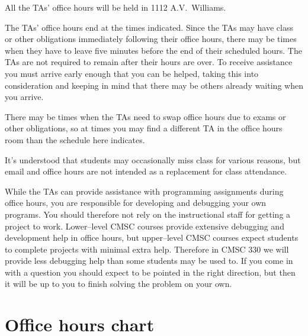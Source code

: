 \documentclass[11pt]{article}
\begin{document}
    All the TAs' office hours will be held in 1112 A.V.\ Williams.

    The TAs' office hours end at the times indicated.  Since the TAs may have
  class or other obligations immediately following their office hours, there
  may be times when they have to leave five minutes before the end of their
  scheduled hours.  The TAs are not required to remain after their hours are
  over.  To receive assistance you must arrive early enough that you can be
  helped, taking this into consideration and keeping in mind that there may
  be others already waiting when you arrive.

    There may be times when the TAs need to swap office hours due to exams
  or other obligations, so at times you may find a different TA in the
  office hours room than the schedule here indicates.

    It's understood that students may occasionally miss class for various
  reasons, but email and office hours are not intended as a replacement for
  class attendance.

    While the TAs can provide assistance with programming assignments during
  office hours, you are responsible for developing and debugging your own
  programs.  You should therefore not rely on the instructional staff for
  getting a project to work.  Lower--level CMSC courses provide extensive
  debugging and development help in office hours, but upper--level CMSC
  courses expect students to complete projects with minimal extra help.
  Therefore in CMSC 330 we will provide less debugging help than some
  students may be used to.  If you come in with a question you should expect
  to be pointed in the right direction, but then it will be up to you to
  finish solving the problem on your own.

  \section{Office hours chart}

    \medskip
\end{document}
